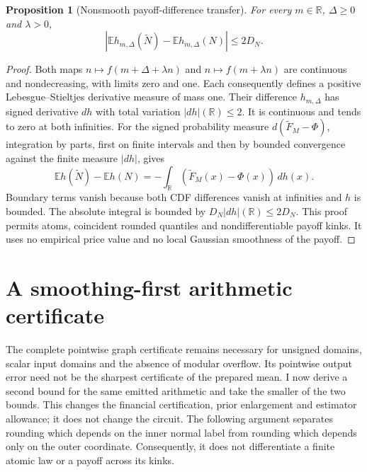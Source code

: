 \documentclass[11pt]{article}
\newtheorem{proposition}[theorem]{Proposition}
\newcommand{\E}{\mathbb E}
\begin{document}
\begin{proposition}[Nonsmooth payoff-difference transfer]\label{prop:raw-tv}
For every $m\in\mathbb R$, $\Delta\geq0$ and $\lambda>0$,
\begin{equation}
 |\E h_{m,\Delta}(\widetilde N)-\E h_{m,\Delta}(N)|\leq2D_N.
\end{equation}
\end{proposition}
\begin{proof}
Both maps $n\mapsto f(m+\Delta+\lambda n)$ and
$n\mapsto f(m+\lambda n)$ are continuous and nondecreasing,
with limits zero and one. Each consequently defines a positive
Lebesgue--Stieltjes derivative measure of mass one. Their difference
$h_{m,\Delta}$ has signed derivative $dh$ with total variation
$|dh|(\mathbb R)\leq2$. It is continuous and tends to zero at
both infinities. For the signed probability measure
$d(\widetilde F_M-\Phi)$, integration by parts, first on finite
intervals and then by bounded convergence against the finite measure
$|dh|$, gives
\begin{equation}
 \E h(\widetilde N)-\E h(N)
   =-\int_{\mathbb R}(\widetilde F_M(x)-\Phi(x))\,dh(x).
\end{equation}
Boundary terms vanish because both CDF differences vanish at infinities
and $h$ is bounded. The absolute integral is bounded by
$D_N|dh|(\mathbb R)\leq2D_N$. This proof permits atoms, coincident
rounded quantiles and nondifferentiable payoff kinks. It uses no empirical
price value and no local Gaussian smoothness of the payoff.
\end{proof}

\section{A smoothing-first arithmetic certificate}
\label{sec:raw-smoothing-first}

The complete pointwise graph certificate remains necessary for unsigned
domains, scalar input domains and the absence of modular overflow. Its
pointwise output error need not be the sharpest certificate of the prepared
mean. I now derive a second bound for the same emitted arithmetic and take
the smaller of the two bounds. This changes the financial certification,
prior enlargement and estimator allowance; it does not change the circuit.
The following argument separates rounding which depends on the inner
normal label from rounding which depends only on the outer coordinate.
Consequently, it does not differentiate a finite atomic law or a payoff
across its kinks.
\end{document}
